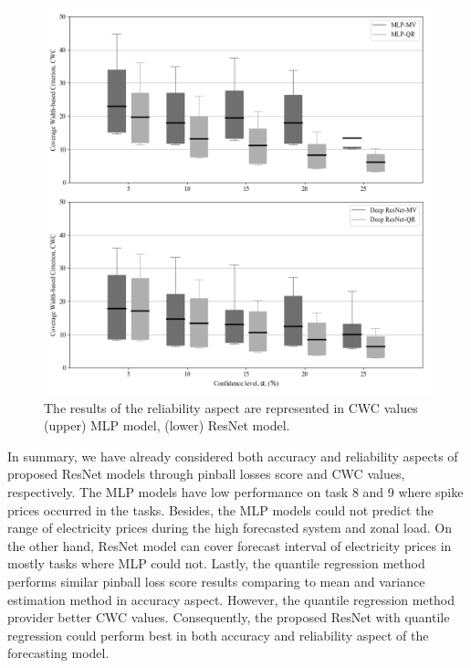 \documentclass[review]{elsarticle}
\begin{document}
    \begin{figure}[H]
      \centering
      \includegraphics[width=12cm]{boxcompare_MV-QR}
      \caption{The results of the reliability aspect are represented in CWC values (upper) MLP model, (lower) ResNet model.}
      \label{Fig:CWC}
    \end{figure}

    In summary, we have already considered both accuracy and reliability aspects of proposed ResNet models through pinball losses score and CWC values, respectively.
    The MLP models have low performance on task 8 and 9 where spike prices occurred in the tasks.
    Besides, the MLP models could not predict the range of electricity prices during the high forecasted system and zonal load.
    On the other hand, ResNet model can cover forecast interval of electricity prices in mostly tasks where MLP could not.
    Lastly, the quantile regression method performs similar pinball loss score results comparing to mean and variance estimation method in accuracy aspect.
    However, the quantile regression method provider better CWC values.
    Consequently, the proposed ResNet with quantile regression could perform best in both accuracy and reliability aspect of the forecasting model.
\end{document}
